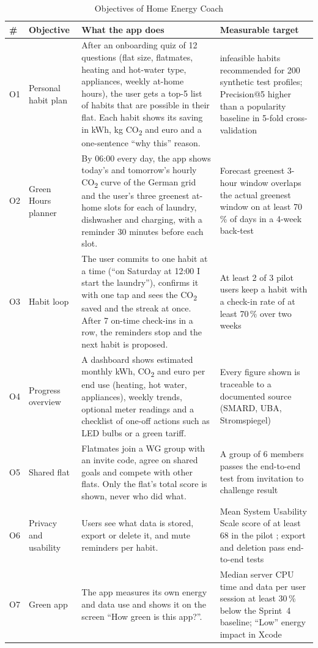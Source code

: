 \documentclass[10pt,twocolumn,letterpaper]{article}
\newcommand{\cotwo}{CO\textsubscript{2}}
\begin{document}
\begin{table}[t]
\caption{Objectives of Home Energy Coach}\label{tab:obj}
\footnotesize
\begin{tabularx}{\textwidth}{@{}p{0.45cm}>{\raggedright\arraybackslash}p{2.1cm}L>{\raggedright\arraybackslash}p{5.2cm}@{}}
\toprule
\# & Objective & What the app does & Measurable target \\
\midrule
O1 & Personal habit plan & After an onboarding quiz of 12 questions (flat size, flatmates, heating and hot-water type, appliances, weekly at-home hours), the user gets a top-5 list of habits that are possible in their flat. Each habit shows its saving in kWh, kg \cotwo{} and euro and a one-sentence ``why this'' reason. & 0 infeasible habits recommended for 200 synthetic test profiles; Precision@5 higher than a popularity baseline in 5-fold cross-validation \\
O2 & Green Hours planner & By 06:00 every day, the app shows today's and tomorrow's hourly \cotwo{} curve of the German grid and the user's three greenest at-home slots for each of laundry, dishwasher and charging, with a reminder 30 minutes before each slot. & Forecast greenest 3-hour window overlaps the actual greenest window on at least 70\,\% of days in a 4-week back-test \\
O3 & Habit loop & The user commits to one habit at a time (``on Saturday at 12:00 I start the laundry''), confirms it with one tap and sees the \cotwo{} saved and the streak at once. After 7 on-time check-ins in a row, the reminders stop and the next habit is proposed. & At least 2 of 3 pilot users keep a habit with a check-in rate of at least 70\,\% over two weeks \\
O4 & Progress overview & A dashboard shows estimated monthly kWh, \cotwo{} and euro per end use (heating, hot water, appliances), weekly trends, optional meter readings and a checklist of one-off actions such as LED bulbs or a green tariff. & Every figure shown is traceable to a documented source (SMARD, UBA, Stromspiegel) \\
O5 & Shared flat & Flatmates join a WG group with an invite code, agree on shared goals and compete with other flats. Only the flat's total score is shown, never who did what. & A group of 6 members passes the end-to-end test from invitation to challenge result \\
O6 & Privacy and usability & Users see what data is stored, export or delete it, and mute reminders per habit. & Mean System Usability Scale score of at least 68 in the pilot \cite{sus}; export and deletion pass end-to-end tests \\
O7 & Green app & The app measures its own energy and data use and shows it on the screen ``How green is this app?''. & Median server CPU time and data per user session at least 30\,\% below the Sprint~4 baseline; ``Low'' energy impact in Xcode \\
\bottomrule
\end{tabularx}
\end{table}
 
\end{document}
